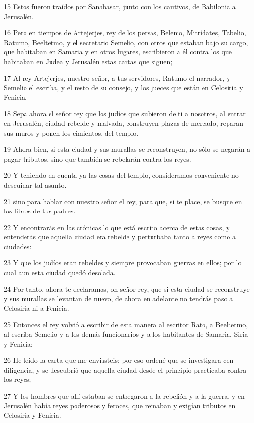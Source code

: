 \par 15 Estos fueron traídos por Sanabasar, junto con los cautivos, de Babilonia a Jerusalén.
\par 16 Pero en tiempos de Artejerjes, rey de los persas, Belemo, Mitrídates, Tabelio, Ratumo, Beeltetmo, y el secretario Semelio, con otros que estaban bajo su cargo, que habitaban en Samaria y en otros lugares, escribieron a él contra los que habitaban en Judea y Jerusalén estas cartas que siguen;
\par 17 Al rey Artejerjes, nuestro señor, a tus servidores, Ratumo el narrador, y Semelio el escriba, y el resto de su consejo, y los jueces que están en Celosiria y Fenicia.
\par 18 Sepa ahora el señor rey que los judíos que subieron de ti a nosotros, al entrar en Jerusalén, ciudad rebelde y malvada, construyen plazas de mercado, reparan sus muros y ponen los cimientos. del templo.
\par 19 Ahora bien, si esta ciudad y sus murallas se reconstruyen, no sólo se negarán a pagar tributos, sino que también se rebelarán contra los reyes.
\par 20 Y teniendo en cuenta ya las cosas del templo, consideramos conveniente no descuidar tal asunto.
\par 21 sino para hablar con nuestro señor el rey, para que, si te place, se busque en los libros de tus padres:
\par 22 Y encontrarás en las crónicas lo que está escrito acerca de estas cosas, y entenderás que aquella ciudad era rebelde y perturbaba tanto a reyes como a ciudades:
\par 23 Y que los judíos eran rebeldes y siempre provocaban guerras en ellos; por lo cual aun esta ciudad quedó desolada.
\par 24 Por tanto, ahora te declaramos, oh señor rey, que si esta ciudad se reconstruye y sus murallas se levantan de nuevo, de ahora en adelante no tendrás paso a Celosiria ni a Fenicia.
\par 25 Entonces el rey volvió a escribir de esta manera al escritor Rato, a Beeltetmo, al escriba Semelio y a los demás funcionarios y a los habitantes de Samaria, Siria y Fenicia;
\par 26 He leído la carta que me enviasteis; por eso ordené que se investigara con diligencia, y se descubrió que aquella ciudad desde el principio practicaba contra los reyes;
\par 27 Y los hombres que allí estaban se entregaron a la rebelión y a la guerra, y en Jerusalén había reyes poderosos y feroces, que reinaban y exigían tributos en Celosiria y Fenicia.
